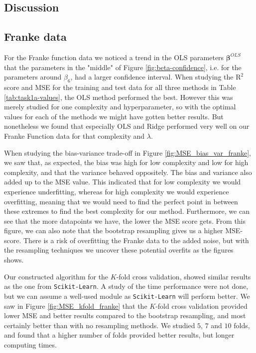 \documentclass[norsk,a4paper,12pt]{article}
\begin{document}
\begin{multicols}{2}
\section{Discussion}\label{sec:discussion}

\subsection{Franke data}

For the Franke function data we noticed a trend in the OLS parameters $\boldsymbol{\beta}^{OLS}$ that the parameters in the "middle" of Figure \ref{fig:beta-confidence}, i.e. for the parameters around $\beta_6$, had a larger confidence interval. When studying the $\mathrm{R}^2$ score and MSE for the training and test data for all three methods in Table \ref{tab:task1a-values}, the OLS method performed the best. However this was merely studied for one complexity and hyperparameter, so with the optimal values for each of the methods we might have gotten better results. But nonetheless we found that especially OLS and Ridge performed very well on our Franke Function data for that complexity and $\lambda$. 

When studying the bias-variance trade-off in Figure \ref{fig:MSE_bias_var_franke}, we saw that, as expected, the bias was high for low complexity and low for high complexity, and that the variance behaved oppositely. The bias and variance also added up to the MSE value. This indicated that for low complexity we would experience underfitting, whereas for high complexity we would experience overfitting, meaning that we would need to find the perfect point in between these extremes to find the best complexity for our method. Furthermore, we can see that the more datapoints we have, the lower the MSE score gets. 
From this figure, we can also note that the bootstrap resampling gives us a higher MSE-score. There is a risk of overfitting the Franke data to the added noise, but with the resampling techniques we uncover these potential overfits as the figures shows. 


Our constructed algorithm for the $K$-fold cross validation, showed similar results as the one from \texttt{Scikit-Learn}. A study of the time performance were not done, but we can assume a well-used module as \texttt{Scikit-Learn} will perform better. We saw in Figure \ref{fig:MSE_kfold_franke} that the $K$-fold cross validation provided lower MSE and better results compared to the bootstrap resampling, and most certainly better than with no resampling methods. We studied $5$, $7$ and $10$ folds, and found that a higher number of folds provided better results, but longer computing times.


\end{multicols}
\end{document}
